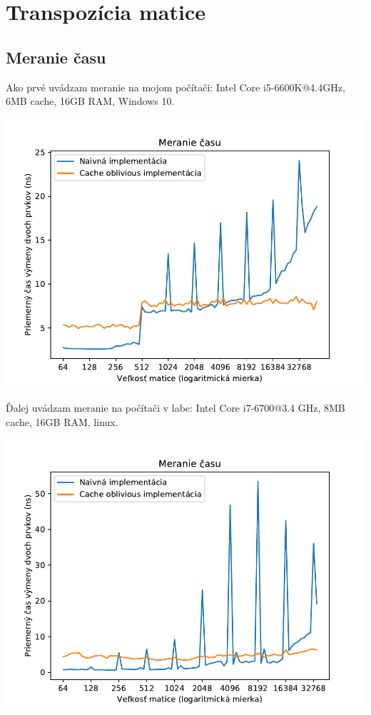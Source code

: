 \documentclass[12pt,a4paper]{article}
\title{}
\author{}
\begin{document}
	\pagestyle{empty}
\section{Transpozícia matice}

\subsection{Meranie času}

Ako prvé uvádzam meranie na mojom počítači: Intel Core i5-6600K@4.4GHz, 6MB cache, 16GB RAM, Windows 10.

\includegraphics[width=\linewidth]{time-6600K.pdf}

\pagebreak

Ďalej uvádzam meranie na počítači v labe: Intel Core i7-6700@3.4 GHz, 8MB cache, 16GB RAM, linux.

\includegraphics[width=\linewidth]{time-6700.pdf}
\end{document}
